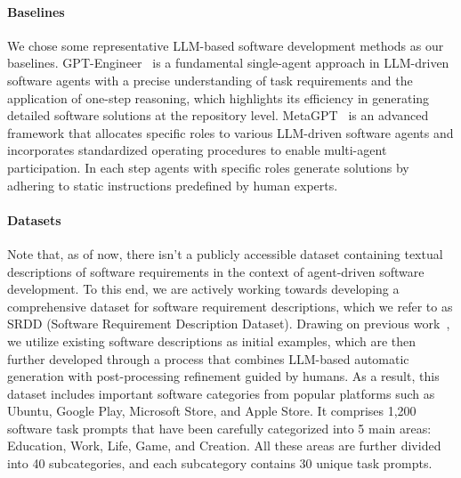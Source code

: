 \documentclass[11pt]{article}
\begin{document}
\noindent \paragraph{Baselines} We chose some representative LLM-based software development methods as our baselines.
GPT-Engineer~\cite{GPTEngineer} is a fundamental single-agent approach in LLM-driven software agents with a precise understanding of task requirements and the application of one-step reasoning, which highlights its efficiency in generating detailed software solutions at the repository level.
MetaGPT~\cite{hong2023metagpt} is an advanced framework that allocates specific roles to various LLM-driven software agents and incorporates standardized operating procedures to enable multi-agent participation. In each step agents with specific roles generate solutions by adhering to static instructions predefined by human experts.

\noindent \paragraph{Datasets} Note that, as of now, there isn't a publicly accessible dataset containing textual descriptions of software requirements in the context of agent-driven software development. 
To this end, we are actively working towards developing a comprehensive dataset for software requirement descriptions, which we refer to as SRDD (Software Requirement Description Dataset).
Drawing on previous work~\cite{li2023camel}, we utilize existing software descriptions as initial examples, which are then further developed through a process that combines LLM-based automatic generation with post-processing refinement guided by humans.
As a result, this dataset includes important software categories from popular platforms such as Ubuntu, Google Play, Microsoft Store, and Apple Store. It comprises 1,200 software task prompts that have been carefully categorized into 5 main areas: Education, Work, Life, Game, and Creation.
All these areas are further divided into 40 subcategories, and each subcategory contains 30 unique task prompts.
\end{document}
